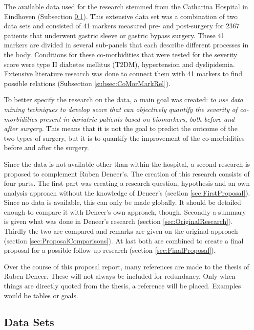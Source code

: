 \documentclass[10pt,a4paper]{article}
\begin{document}
	The available data used for the research stemmed from the Catharina Hospital in Eindhoven (Subsection \ref{subsec:DataSets}). This extensive data set was a combination of two data sets and consisted of 41 markers measured pre- and post-surgery for 2367 patients that underwent gastric sleeve or gastric bypass surgery. These 41 markers are divided in several sub-panels that each describe different processes in the body. Conditions for these co-morbidities that were tested for the severity score were type II diabetes mellitus (T2DM), hypertension and dyslipidemia. Extensive literature research was done to connect them with 41 markers to find possible relations (Subsection \ref{subsec:CoMorMarkRel}).

	To better specify the research on the data, a main goal was created: \emph{to use data mining techniques to develop score that can objectively quantify the severity of co-morbidities present in bariatric patients based on biomarkers, both before and after surgery.}\cite{Deneer2017Thesis} This means that it is not the goal to predict the outcome of the two types of surgery, but it is to quantify the improvement of the co-morbidities before and after the surgery.

	Since the data is not available other than within the hospital, a second research is proposed to complement Ruben Deneer's. The creation of this research consists of four parts. The first part was creating a research question, hypothesis and an own analysis approach without the knowledge of Deneer's (section \ref{sec:FirstProposal}). Since no data is available, this can only be made globally. It should be detailed enough to compare it with Deneer's own approach, though. Secondly a summary is given what was done in Deneer's research (section \ref{sec:OriginalResearch}). Thirdly the two are compared and remarks are given on the original approach (section \ref{sec:ProposalComparisons}). At last both are combined to create a final proposal for a possible follow-up research (section \ref{sec:FinalProposal}). 
	
	Over the course of this proposal report, many references are made to the thesis of Ruben Deneer. These will not always be included for redundancy. Only when things are directly quoted from the thesis, a reference will be placed. Examples would be tables or goals.
	
	\subsection{Data Sets}
	\label{subsec:DataSets}
	
\end{document}
